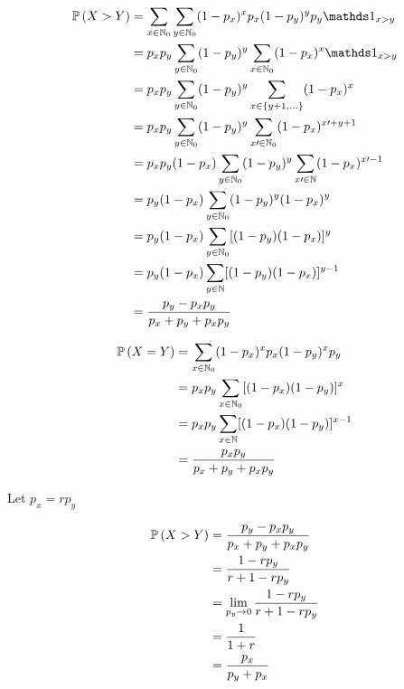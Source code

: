 \documentclass[12pt]{article}
\begin{document}
\begin{enumerate}


\begin{align*}
    \prob{X > Y} &= \sum_{x \in \naturals_0} \sum_{y \in \naturals_0} (1-p_x)^x p_x (1-p_y) ^y p_y \indic{x>y} \\ 
    &= p_xp_y \sum_{y \in \naturals_0} (1-p_y)^y  \sum_{x \in \naturals_0} (1-p_x)^x \indic{x>y} \\ 
    &= p_xp_y \sum_{y \in \naturals_0} (1-p_y)^y \sum_{x \in \braces{y+1, \ldots}} (1-p_x)^x \\ 
    &= p_xp_y \sum_{y \in \naturals_0} (1-p_y)^y \sum_{x\prime \in \naturals_0} (1-p_x)^{x\prime+y+1} \\
    &= p_xp_y(1-p_x) \sum_{y \in \naturals_0} (1-p_y)^y \sum_{x\prime \in \naturals} (1-p_x)^{x\prime-1} \\
    &= p_y(1-p_x) \sum_{y \in \naturals_0} (1-p_y)^y(1-p_x)^y \\ 
    &= p_y(1-p_x) \sum_{y \in \naturals_0} [(1-p_y)(1-p_x)]^y \\ 
    &= p_y(1-p_x) \sum_{y \in \naturals} [(1-p_y)(1-p_x)]^{y-1} \\ 
    &= \frac{p_y - p_xp_y}{p_x + p_y + p_xp_y}  
\end{align*}


\begin{align*}
    \mathbb{P}\left(X=Y\right) &= \sum_{x \in\mathbb{N}_0} (1-p_x)^xp_x(1-p_y)^xp_y \\
    &= p_xp_y \sum_{x \in\mathbb{N}_0} [(1-p_x)(1-p_y)]^x \\ 
    &= p_xp_y \sum_{x \in\mathbb{N}}  [(1-p_x)(1-p_y)]^{x-1} \\ 
    &= \frac{p_xp_y}{p_x+p_y+p_xp_y} 
\end{align*}


Let $p_x = rp_y$ 

\begin{align*}
    \mathbb{P}\left(X > Y\right) &= \frac{p_y - p_xp_y}{p_x + p_y + p_xp_y} \\ 
    &= \frac{1-rp_y}{r+1-rp_y} \\ 
    &= \lim_{p_y \to 0} \frac{1-rp_y}{r+1-rp_y} \\
    &= \frac{1}{1+r} \\
    &= \frac{p_x}{p_y + p_x}
\end{align*}


\end{enumerate}
\end{document}
